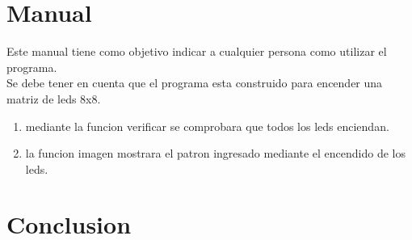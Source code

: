 \documentclass{article}
\begin{document}
\section{Manual}
Este manual tiene como objetivo indicar a cualquier persona como utilizar el programa.\\
Se debe tener en cuenta que el programa esta construido para encender una matriz de leds 8x8.\\
\begin{enumerate}
    \item mediante la funcion verificar se comprobara que todos los leds enciendan.\\
    \item la funcion imagen mostrara el patron ingresado mediante el encendido de los leds.
\end{enumerate}



\newpage
\section{Conclusion} \label{conclusion}
\end{document}

